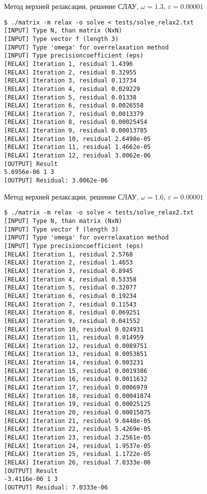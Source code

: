 \documentclass[a4paper,11pt]{report}
\begin{document}
\begin{bash}
\caption{Метод верхней релаксации, решение СЛАУ, $\omega = 1.3$, $\varepsilon = 0.00001$}
\begin{verbatim}
$ ./matrix -m relax -o solve < tests/solve_relax2.txt 
[INPUT] Type N, than matrix (NxN)
[INPUT] Type vector f (length 3)
[INPUT] Type 'omega' for overrelaxation method
[INPUT] Type precisioncoefficient (eps)
[RELAX] Iteration 1, residual 1.4396
[RELAX] Iteration 2, residual 0.32955
[RELAX] Iteration 3, residual 0.13734
[RELAX] Iteration 4, residual 0.029229
[RELAX] Iteration 5, residual 0.01338
[RELAX] Iteration 6, residual 0.0026558
[RELAX] Iteration 7, residual 0.0013379
[RELAX] Iteration 8, residual 0.00025454
[RELAX] Iteration 9, residual 0.00013785
[RELAX] Iteration 10, residual 2.6498e-05
[RELAX] Iteration 11, residual 1.4662e-05
[RELAX] Iteration 12, residual 3.0062e-06
[OUTPUT] Result
5.6956e-06 1 3 
[OUTPUT] Residual: 3.0062e-06
\end{verbatim}
\end{bash}

\begin{bash}
\caption{Метод верхней релаксации, решение СЛАУ, $\omega = 1.6$, $\varepsilon = 0.00001$}
\begin{verbatim}
$ ./matrix -m relax -o solve < tests/solve_relax2.txt 
[INPUT] Type N, than matrix (NxN)
[INPUT] Type vector f (length 3)
[INPUT] Type 'omega' for overrelaxation method
[INPUT] Type precisioncoefficient (eps)
[RELAX] Iteration 1, residual 2.5768
[RELAX] Iteration 2, residual 1.4653
[RELAX] Iteration 3, residual 0.8945
[RELAX] Iteration 4, residual 0.53358
[RELAX] Iteration 5, residual 0.32077
[RELAX] Iteration 6, residual 0.19234
[RELAX] Iteration 7, residual 0.11543
[RELAX] Iteration 8, residual 0.069251
[RELAX] Iteration 9, residual 0.041552
[RELAX] Iteration 10, residual 0.024931
[RELAX] Iteration 11, residual 0.014959
[RELAX] Iteration 12, residual 0.0089751
[RELAX] Iteration 13, residual 0.0053851
[RELAX] Iteration 14, residual 0.003231
[RELAX] Iteration 15, residual 0.0019386
[RELAX] Iteration 16, residual 0.0011632
[RELAX] Iteration 17, residual 0.0006979
[RELAX] Iteration 18, residual 0.00041874
[RELAX] Iteration 19, residual 0.00025125
[RELAX] Iteration 20, residual 0.00015075
[RELAX] Iteration 21, residual 9.0448e-05
[RELAX] Iteration 22, residual 5.4269e-05
[RELAX] Iteration 23, residual 3.2561e-05
[RELAX] Iteration 24, residual 1.9537e-05
[RELAX] Iteration 25, residual 1.1722e-05
[RELAX] Iteration 26, residual 7.0333e-06
[OUTPUT] Result
-3.4116e-06 1 3 
[OUTPUT] Residual: 7.0333e-06
\end{verbatim}
\end{bash}
\end{document}
